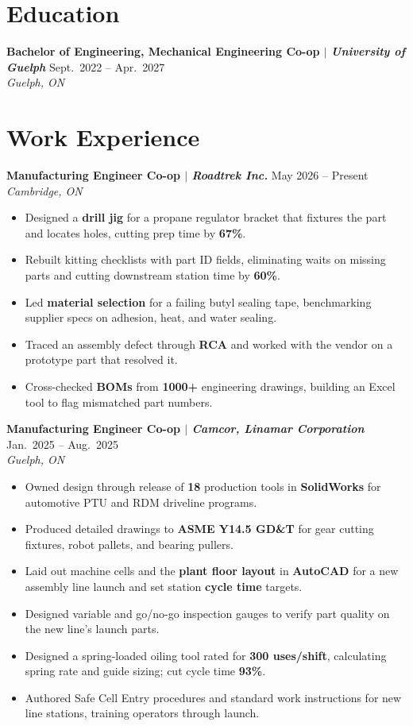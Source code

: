 \documentclass[11pt, letterpaper]{article}
\newcommand{\workEntry}[3]{%
  \noindent\textbf{#1} \hfill #2 \\
  \textit{#3}\vspace{0.5pt}
}
\newenvironment{resumelist}{%
  \begin{itemize}[leftmargin=1.5em, itemsep=0.5pt, topsep=1pt, parsep=0pt]
}{%
  \end{itemize}\vspace{0.5pt}
}
\begin{document}
\section{Education}

\workEntry{Bachelor of Engineering, Mechanical Engineering Co-op \textnormal{$|$ \itshape University of Guelph}}{Sept.~2022 -- Apr.~2027}{Guelph, ON}

\section{Work Experience}

\workEntry{Manufacturing Engineer Co-op \textnormal{$|$ \itshape Roadtrek Inc.}}{May 2026 -- Present}{Cambridge, ON}
\begin{resumelist}
    \item Designed a \textbf{drill jig} for a propane regulator bracket that fixtures the part and locates holes, cutting prep time by \textbf{67\%}.
    \item Rebuilt kitting checklists with part ID fields, eliminating waits on missing parts and cutting downstream station time by \textbf{60\%}.
    \item Led \textbf{material selection} for a failing butyl sealing tape, benchmarking supplier specs on adhesion, heat, and water sealing.
    \item Traced an assembly defect through \textbf{RCA} and worked with the vendor on a prototype part that resolved it.
    \item Cross-checked \textbf{BOMs} from \textbf{1000+} engineering drawings, building an Excel tool to flag mismatched part numbers.
\end{resumelist}

\workEntry{Manufacturing Engineer Co-op \textnormal{$|$ \itshape Camcor, Linamar Corporation}}{Jan.~2025 -- Aug.~2025}{Guelph, ON}
\begin{resumelist}
        \item Owned design through release of \textbf{18} production tools in \textbf{SolidWorks} for automotive PTU and RDM driveline programs.
    \item Produced detailed drawings to \textbf{ASME Y14.5 GD\&T} for gear cutting fixtures, robot pallets, and bearing pullers.
    \item Laid out machine cells and the \textbf{plant floor layout} in \textbf{AutoCAD} for a new assembly line launch and set station \textbf{cycle time} targets.
    \item Designed variable and go/no-go inspection gauges to verify part quality on the new line's launch parts.
    \item Designed a spring-loaded oiling tool rated for \textbf{300 uses/shift}, calculating spring rate and guide sizing; cut cycle time \textbf{93\%}.
    \item Authored Safe Cell Entry procedures and standard work instructions for new line stations, training operators through launch.
\end{resumelist}
\end{document}
